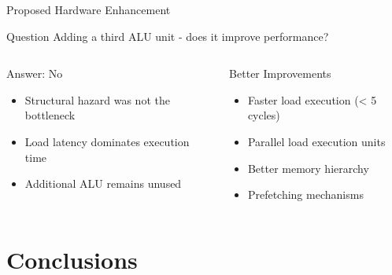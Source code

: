 \documentclass[aspectratio=169,12pt]{beamer}
\begin{document}
\begin{frame}{Proposed Hardware Enhancement}
\begin{block}{Question}
Adding a third ALU unit - does it improve performance?
\end{block}

\vspace{0.5cm}

\begin{columns}
\begin{block}{Answer: No}
\begin{itemize}
    \item Structural hazard was not the bottleneck
    \item Load latency dominates execution time
    \item Additional ALU remains unused
\end{itemize}
\end{block}

\begin{block}{Better Improvements}
\begin{itemize}
    \item Faster load execution (< 5 cycles)
    \item Parallel load execution units
    \item Better memory hierarchy
    \item Prefetching mechanisms
\end{itemize}
\end{block}
\end{columns}
\end{frame}

\section{Conclusions}
\end{document}
